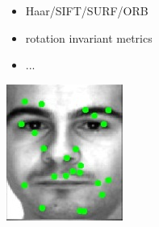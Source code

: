
\begin{xpsectionbox}{}{}


\begin{minipage}{0.5\linewidth}

{\vspace*{0.2cm}\noindent\hspace*{0.2cm}{\bf\Titlesize Method}\newline}{\vspace{-0.75cm}}

\begin{itemize}
	  \item Haar/SIFT/SURF/ORB
	  \item rotation invariant metrics
	  \item ...
\end{itemize}
\begin{center}
			\includegraphics[height=0.25\linewidth]{images/face_sift}
\end{center}


\end{minipage}
\begin{minipage}{0.5\linewidth}

{\vspace*{0.2cm}\noindent\hspace*{0.2cm}{\bf\Titlesize Improvements}\newline}{\vspace{-0.75cm}}


\end{minipage}
\end{xpsectionbox}

